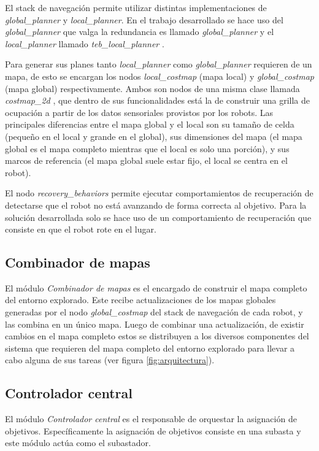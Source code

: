 El stack de navegación permite utilizar distintas implementaciones de
\emph{global\_planner} y \emph{local\_planner}. En el trabajo desarrollado se
hace uso del \emph{global\_planner} que valga la redundancia es llamado
\emph{global\_planner} \cite{ROS-global_planner}  y el \emph{local\_planner}
llamado \emph{teb\_local\_planner} \cite{ROS-teb_local_planner}.

Para generar sus planes tanto \emph{local\_planner} como \emph{global\_planner}
requieren de un mapa, de esto se encargan los nodos \emph{local\_costmap} (mapa
local) y \emph{global\_costmap} (mapa global) respectivamente. Ambos son
nodos de una misma clase llamada \emph{costmap\_2d}
\cite{ROS-costmap_2d}, que dentro de sus funcionalidades está la de
construir una grilla de ocupación a partir de los datos sensoriales provistos
por los robots. Las principales diferencias entre el mapa global y el local son su
tamaño de celda (pequeño en el local y grande en el global), sus dimensiones
del mapa (el mapa global es el mapa completo mientras que el local es solo una
porción), y sus marcos de referencia (el mapa global suele estar fijo, el local se
centra en el robot).

El nodo \emph{recovery\_behaviors} permite ejecutar comportamientos de
recuperación de detectarse que el robot no está avanzando de forma correcta al
objetivo. Para la solución desarrollada solo se hace uso de un comportamiento
de recuperación que consiste en que el robot rote en el lugar.

\subsection{Combinador de mapas}
El módulo \emph{Combinador de mapas} es el encargado de construir el mapa
completo del entorno explorado. Este recibe actualizaciones de los mapas
globales generadas por el nodo \emph{global\_costmap} del stack de navegación
de cada robot, y las combina en un único mapa. Luego de combinar una
actualización, de existir cambios en el mapa completo estos se distribuyen a
los diversos componentes del sistema que requieren del mapa completo del
entorno explorado para llevar a cabo alguna de sus tareas (ver figura
\ref{fig:arquitectura}). 

\subsection{Controlador central}

El módulo \emph{Controlador central} es el responsable de orquestar la
asignación de objetivos. Específicamente la asignación de objetivos consiste en
una subasta y este módulo actúa como el subastador. 


